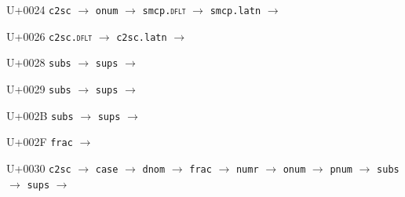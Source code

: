 \documentclass{article}
\begin{document}
\pagestyle{ucsheadings}

\begin{substitutions}

U+0024  \linebreak
    \texttt{c2sc} $\to$  \linebreak
    \texttt{onum} $\to$  \linebreak
    \texttt{smcp.\textsc{dflt}} $\to$  \linebreak
    \texttt{smcp.latn} $\to$  

\goodbreak

U+0026  \linebreak
    \texttt{c2sc.\textsc{dflt}} $\to$  \linebreak
    \texttt{c2sc.latn} $\to$  

\goodbreak

U+0028  \linebreak
    \texttt{subs} $\to$  \linebreak
    \texttt{sups} $\to$  

\goodbreak

U+0029  \linebreak
    \texttt{subs} $\to$  \linebreak
    \texttt{sups} $\to$  

\goodbreak

U+002B  \linebreak
    \texttt{subs} $\to$  \linebreak
    \texttt{sups} $\to$  

\goodbreak

U+002F  \linebreak
    \texttt{frac} $\to$  

\goodbreak

U+0030  \linebreak
    \texttt{c2sc} $\to$  \linebreak
    \texttt{case} $\to$  \linebreak
    \texttt{dnom} $\to$  \linebreak
    \texttt{frac} $\to$  \linebreak
    \texttt{numr} $\to$  \linebreak
    \texttt{onum} $\to$  \linebreak
    \texttt{pnum} $\to$  \linebreak
    \texttt{subs} $\to$  \linebreak
    \texttt{sups} $\to$  


\end{substitutions}
\end{document}
